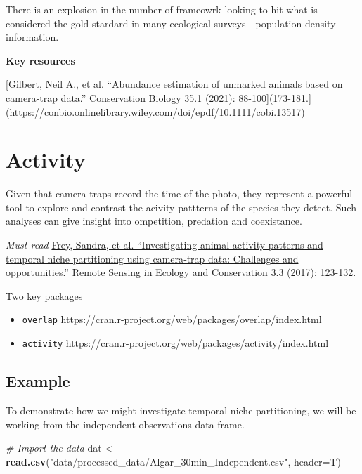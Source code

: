 \documentclass[]{book}
\newenvironment{Shaded}{\begin{snugshade}}{\end{snugshade}}
\newcommand{\KeywordTok}[1]{\textcolor[rgb]{0.13,0.29,0.53}{\textbf{#1}}}
\newcommand{\DataTypeTok}[1]{\textcolor[rgb]{0.13,0.29,0.53}{#1}}
\newcommand{\StringTok}[1]{\textcolor[rgb]{0.31,0.60,0.02}{#1}}
\newcommand{\CommentTok}[1]{\textcolor[rgb]{0.56,0.35,0.01}{\textit{#1}}}
\newcommand{\NormalTok}[1]{#1}
\providecommand{\tightlist}{%
  \setlength{\itemsep}{0pt}\setlength{\parskip}{0pt}}
\begin{document}
There is an explosion in the number of frameowrk looking to hit what is
considered the gold stardard in many ecological surveys - population
density information.

\textbf{Key resources}

{[}Gilbert, Neil A., et al. ``Abundance estimation of unmarked animals
based on camera‐trap data.'' Conservation Biology 35.1 (2021):
88-100{]}(173-181.{]}(\url{https://conbio.onlinelibrary.wiley.com/doi/epdf/10.1111/cobi.13517})

\chapter{Activity}\label{activity}

Given that camera traps record the time of the photo, they represent a
powerful tool to explore and contrast the acivity pattterns of the
species they detect. Such analyses can give insight into ompetition,
predation and coexistance.

\emph{Must read}
\href{https://zslpublications.onlinelibrary.wiley.com/doi/full/10.1002/rse2.60}{Frey,
Sandra, et al. ``Investigating animal activity patterns and temporal
niche partitioning using camera‐trap data: Challenges and
opportunities.'' Remote Sensing in Ecology and Conservation 3.3 (2017):
123-132.}

Two key packages

\begin{itemize}
\tightlist
\item
  \texttt{overlap}
  \url{https://cran.r-project.org/web/packages/overlap/index.html}
\item
  \texttt{activity}
  \url{https://cran.r-project.org/web/packages/activity/index.html}
\end{itemize}

\section{Example}\label{example}

To demonstrate how we might investigate temporal niche partitioning, we
will be working from the independent observations data frame.

\begin{Shaded}
\begin{Highlighting}[]
\CommentTok{# Import the data}
\NormalTok{dat <-}\StringTok{ }\KeywordTok{read.csv}\NormalTok{(}\StringTok{"data/processed_data/Algar_30min_Independent.csv"}\NormalTok{, }\DataTypeTok{header=}\NormalTok{T)}
\end{Highlighting}
\end{Shaded}
\end{document}
